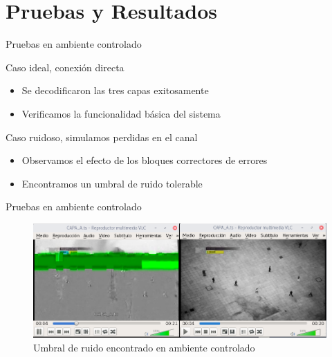 \section{Pruebas y Resultados}

\begin{frame}{Pruebas en ambiente controlado}
\begin{block}{Caso ideal, conexión directa}
	\begin{itemize}
		\item { Se decodificaron las tres capas exitosamente }
		\item { Verificamos la funcionalidad básica del sistema }
	\end{itemize}
\end{block}

\begin{block}{Caso ruidoso, simulamos perdidas en el canal}
	\begin{itemize}
		\item {	Observamos el efecto de los bloques correctores de errores }
		\item { Encontramos un umbral de ruido tolerable }
	\end{itemize}
\end{block}
\end{frame}

\begin{frame}{Pruebas en ambiente controlado}
	\begin{figure}
		\includegraphics[scale=0.35]{calidad_imagen}
		\caption{Umbral de ruido encontrado en ambiente controlado}
	\end{figure}
\end{frame}

